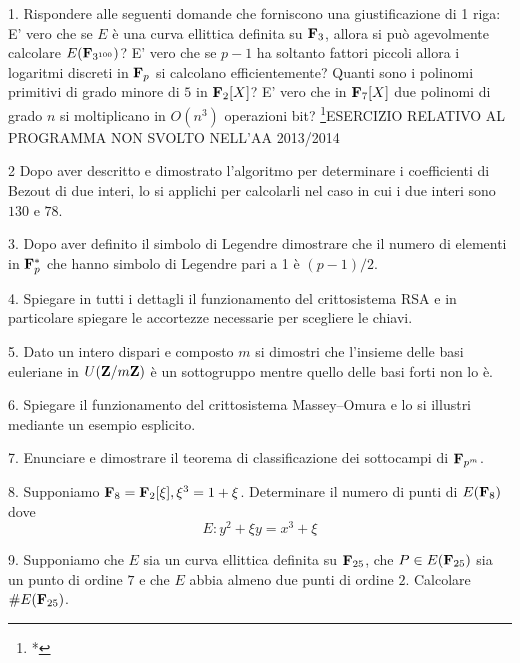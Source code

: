 \item{1.} Rispondere alle seguenti domande che forniscono una giustificazione di 1 riga:
 E' vero che se $E$ \`e una curva ellittica definita su ${\bf F}_{3}$, allora
si pu\`o agevolmente calcolare $E({\bf F}_{3^{100}})$?
 E' vero che se $p-1$ ha soltanto fattori piccoli allora i logaritmi discreti in ${\bf F}_p$ si
calcolano efficientemente?
 Quanti sono i polinomi primitivi di grado minore di $5$ in ${\bf F}_2[X]$?
 E' vero che in ${\bf F}_7[X]$ due polinomi di grado $n$ si moltiplicano in $O(n^3)$ operazioni bit?
 \footnote{*}{ESERCIZIO RELATIVO AL PROGRAMMA NON SVOLTO NELL'AA 2013/2014} 
\item{2} Dopo aver descritto e dimostrato l'algoritmo per determinare i coefficienti di Bezout di due interi, lo si applichi per
calcolarli nel caso in cui i due interi sono $130$ e $78$.
\item{3.} Dopo aver definito il simbolo di Legendre dimostrare che il numero di elementi in ${\bf F}_p^*$ che
hanno simbolo di Legendre pari a 1 \`e $(p-1)/2$.
\item{4.} Spiegare in tutti i dettagli il funzionamento del crittosistema RSA e in particolare spiegare le accortezze
necessarie per scegliere le chiavi.
\item{5.} Dato un intero dispari e composto $m$ si dimostri che l'insieme delle basi euleriane in $U({\bf Z}/m{\bf Z})$ \`e
un sottogruppo mentre quello delle basi forti non lo \`e.
\item{6.} Spiegare il funzionamento del crittosistema Massey--Omura e lo si illustri mediante un esempio esplicito.
\item{7.} Enunciare e dimostrare il teorema di classificazione dei sottocampi di ${\bf F}_{p^m}$.
\item{8.} Supponiamo ${\bf F}_8={\bf F}_2[\xi], \xi^3=1+\xi$. 
Determinare il numero di punti di $E({\bf F}_8)$ dove 
$$E: y^2+\xi y=x^3+\xi$$
\item{9.} Supponiamo che $E$ sia un curva ellittica definita su ${\bf F}_{25}$, che $P\in E({\bf F}_{25})$ sia un punto di
ordine $7$ e che $E$ abbia almeno due punti di ordine $2$. Calcolare $\#E({\bf F}_{25})$.
\bigskip

